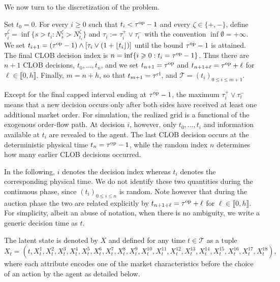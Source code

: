 \documentclass[11pt]{article}
\begin{document}
We now turn to the discretization of the problem.

\begin{definition}
\label{def:timing}
Set $t_0=0$. For every $i\geqslant0$ such that
$t_i<{\tau^{\mathrm{op}}}-1$ and every $\zeta\in\{+,-\}$, define $\tau_i^\zeta = \inf\{ s>t_i: N_s^\zeta>N_{t_i}^\zeta\}$ and $\tau_i:=\tau_i^+\vee\tau_i^-$ with the convention $\inf\emptyset=+\infty$. We set $t_{i+1} = ({\tau^{\mathrm{op}}}-1) \wedge \left[ \tau_i\vee(1+\lfloor t_i\rfloor) \right]$ until the bound ${\tau^{\mathrm{op}}}-1$ is attained. The final CLOB decision index is $n=\inf\{i\geqslant 0:t_i={\tau^{\mathrm{op}}}-1\}$. Thus there are $n+1$ CLOB decisions, $t_0,\ldots,t_n$, and we set $t_{n+1}=\tau^{\mathrm{op}}$ and $t_{n+1+\ell}=\tau^{\mathrm{op}}+\ell$ for $\ell\in \llbracket 0,h \rrbracket$. Finally, $m=n+h$, so that $t_{m+1}=\tau^{\mathrm{cl}}$, and $\mathcal T=(t_i)_{0\leqslant  i\leqslant  m+1}$.
\end{definition}

\begin{remark}
    Except for the final capped interval ending at ${\tau^{\mathrm{op}}}-1$, the maximum $\tau_i^+\vee\tau_i^-$ means that a new decision occurs only after both sides have received at least one additional market order. For simulation, the realized grid is a functional of the exogenous order-flow path. At decision $i$, however, only $t_0,\ldots, t_i$ and information available at $t_i$ are revealed to the agent. The last CLOB decision occurs at the deterministic physical time $t_n = {\tau^{\mathrm{op}}}-1$, while the random index $n$ determines how many earlier CLOB decisions occurred.
\end{remark}

{In the following, $i$ denotes the decision index whereas $t_i$ denotes
the corresponding physical time. We do not identify these two quantities
during the continuous phase, since $(t_i)_{0\leqslant i\leqslant n}$ is random. Note however that during the auction phase the two are related explicitly by $t_{n+1+\ell}=\tau^{\mathrm{op}}+\ell$ for $\ell \in \llbracket 0,h \rrbracket$.
For simplicity, albeit an abuse of notation, when there is no ambiguity, we write a generic decision time as $t$.}\vspace{0.5em}

The latent state is denoted by $X$ and defined for any time $t\in \mathcal{T}$ as a tuple 
\[X_t = (t, X_t^1, X_t^2, X_t^3, X_t^4, X_t^5, X_t^6, X_t^7, X_t^8, X_t^9, X_t^{10}, X_t^{11}, X_t^{12}, X_t^{13}, X_t^{14}, X_t^{15}, X_t^{16}, X_t^{17}, X_t^{18}),\] where each attribute encodes one of the market characteristics before the choice of an action by the agent as detailed below.
\end{document}
